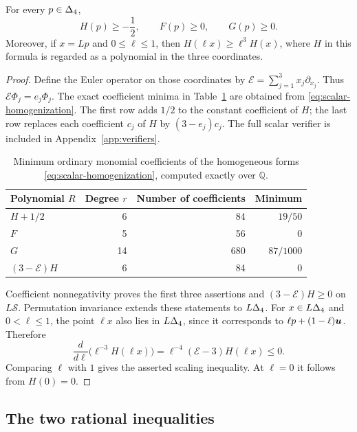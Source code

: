 \begin{lemma}
\label{lem:scalar-checks}
For every $p\in\Delta_4$,
\[
 H(p)\ge-\frac12,\qquad F(p)\ge0,\qquad G(p)\ge0.
\]
Moreover, if $x=Lp$ and $0\le\ell\le1$, then
$H(\ell x)\ge\ell^3H(x)$, where $H$ in this formula is regarded as a
polynomial in the three coordinates.
\end{lemma}

\begin{proof}
Define the Euler operator on those coordinates by
$\mathcal E=\sum_{j=1}^3x_j\partial_{x_j}$. Thus
$\mathcal E\Phi_j=e_j\Phi_j$. The exact coefficient minima in
Table~\ref{tab:scalar-coefficients} are obtained from
\eqref{eq:scalar-homogenization}. The first row adds $1/2$ to the
constant coefficient of $H$; the last row replaces each coefficient
$c_j$ of $H$ by $(3-e_j)c_j$. The full scalar verifier is included in
Appendix~\ref{app:verifiers}.

\begin{table}[tb]
 \centering
 \begin{tabular}{lrrr}
  \hline
  Polynomial $R$ & Degree $r$ & Number of coefficients & Minimum\\
  \hline
  $H+1/2$          & 6  & 84  & $19/50$\\
  $F$              & 5  & 56  & $0$\\
  $G$              & 14 & 680 & $87/1000$\\
  $(3-\mathcal E)H$ & 6  & 84  & $0$\\
  \hline
 \end{tabular}
 \caption{Minimum ordinary monomial coefficients of the homogeneous
 forms \eqref{eq:scalar-homogenization}, computed exactly over $\mathbb Q$.}
 \label{tab:scalar-coefficients}
\end{table}

Coefficient nonnegativity proves the first three assertions and
$(3-\mathcal E)H\ge0$ on $L\mathcal S$. Permutation invariance extends
these statements to $L\Delta_4$. For $x\in L\Delta_4$ and
$0<\ell\le1$, the point $\ell x$ also lies in $L\Delta_4$, since
it corresponds to $\ell p+(1-\ell)\boldsymbol u$. Therefore
\[
 \frac{d}{d\ell}\bigl(\ell^{-3}H(\ell x)\bigr)
 =\ell^{-4}(\mathcal E-3)H(\ell x)\le0.
\]
Comparing $\ell$ with $1$ gives the asserted scaling inequality.
At $\ell=0$ it follows from $H(0)=0$.
\end{proof}

\subsection{The two rational inequalities}

